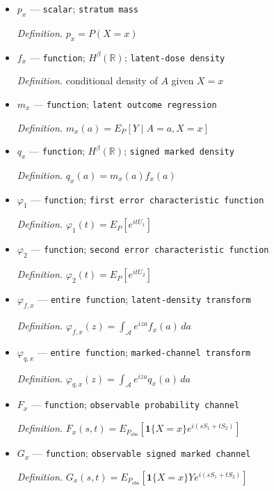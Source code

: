 \documentclass{article}
\begin{document}
\begin{itemize}
  \par\smallskip\noindent\emph{Definition.} law of \(O\) induced by \(P\)
  \item \(p_x\) --- \texttt{scalar}; \texttt{stratum mass}
  \par\smallskip\noindent\emph{Definition.} \(p_x=P(X=x)\)
  \item \(f_x\) --- \texttt{function}; \(H^{\beta}(\mathbb R)\); \texttt{latent-\allowbreak{}dose density}
  \par\smallskip\noindent\emph{Definition.} conditional density of \(A\) given \(X=x\)
  \item \(m_x\) --- \texttt{function}; \texttt{latent outcome regression}
  \par\smallskip\noindent\emph{Definition.} \(m_x(a)=E_P[Y\mid A=a,X=x]\)
  \item \(q_x\) --- \texttt{function}; \(H^{\beta}(\mathbb R)\); \texttt{signed marked density}
  \par\smallskip\noindent\emph{Definition.} \(q_x(a)=m_x(a)f_x(a)\)
  \item \(\varphi_1\) --- \texttt{function}; \texttt{first error characteristic function}
  \par\smallskip\noindent\emph{Definition.} \(\varphi_1(t)=E_P[e^{itU_1}]\)
  \item \(\varphi_2\) --- \texttt{function}; \texttt{second error characteristic function}
  \par\smallskip\noindent\emph{Definition.} \(\varphi_2(t)=E_P[e^{itU_2}]\)
  \item \(\varphi_{f,x}\) --- \texttt{entire function}; \texttt{latent-\allowbreak{}density transform}
  \par\smallskip\noindent\emph{Definition.} \(\varphi_{f,x}(z)=\int_{\mathcal A}e^{iza}f_x(a)\,da\)
  \item \(\varphi_{q,x}\) --- \texttt{entire function}; \texttt{marked-\allowbreak{}channel transform}
  \par\smallskip\noindent\emph{Definition.} \(\varphi_{q,x}(z)=\int_{\mathcal A}e^{iza}q_x(a)\,da\)
  \item \(F_x\) --- \texttt{function}; \texttt{observable probability channel}
  \par\smallskip\noindent\emph{Definition.} \(F_x(s,t)=E_{P_{\mathrm{obs}}}[\mathbf 1\{X=x\}e^{i(sS_1+tS_2)}]\)
  \item \(G_x\) --- \texttt{function}; \texttt{observable signed marked channel}
  \par\smallskip\noindent\emph{Definition.} \(G_x(s,t)=E_{P_{\mathrm{obs}}}[\mathbf 1\{X=x\}Ye^{i(sS_1+tS_2)}]\)

\end{itemize}
\end{document}
